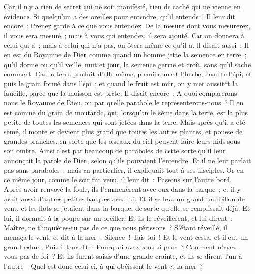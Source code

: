 \begin{multicols}{2}
Car il n'y a rien de secret qui ne soit manifesté, rien de caché qui ne vienne en évidence.
Si quelqu'un a des oreilles pour entendre, qu'il entende~!
Il leur dit encore~: Prenez garde à ce que vous entendez. De la mesure dont vous mesurerez, il vous sera mesuré~; mais à vous qui entendez, il sera ajouté.
Car on donnera à celui qui a~; mais à celui qui n'a pas, on ôtera même ce qu'il a.
Il disait aussi~: Il en est du Royaume de Dieu comme quand un homme jette la semence en terre~;
qu'il dorme ou qu'il veille, nuit et jour, la semence germe et croît, sans qu'il sache comment.
Car la terre produit d'elle-même, premièrement l'herbe, ensuite l'épi, et puis le grain formé dans l'épi~;
et quand le fruit est mûr, on y met aussitôt la faucille, parce que la moisson est prête.
Il disait encore~: A quoi comparerons-nous le Royaume de Dieu, ou par quelle parabole le représenterons-nous~?
Il en est comme du grain de moutarde, qui, lorsqu'on le sème dans la terre, est la plus petite de toutes les semences qui sont jetées dans la terre.
Mais après qu'il a été semé, il monte et devient plus grand que toutes les autres plantes, et pousse de grandes branches, en sorte que les oiseaux du ciel peuvent faire leurs nids sous son ombre.
Ainsi c'est par beaucoup de paraboles de cette sorte qu'il leur annonçait la parole de Dieu, selon qu'ils pouvaient l'entendre.
Et il ne leur parlait pas sans paraboles~; mais en particulier, il expliquait tout à ses disciples.
Or en ce même jour, comme le soir fut venu, il leur dit~: Passons sur l'autre bord.
Après avoir renvoyé la foule, ils l'emmenèrent avec eux dans la barque~; et il y avait aussi d'autres petites barques avec lui.
Et il se leva un grand tourbillon de vent, et les flots se jetaient dans la barque, de sorte qu'elle se remplissait déjà.
Et lui, il dormait à la poupe sur un oreiller. Et ils le réveillèrent, et lui dirent~: Maître, ne t'inquiètes-tu pas de ce que nous périssons~?
S'étant réveillé, il menaça le vent, et dit à la mer~: Silence~! Tais-toi~! Et le vent cessa, et il eut un grand calme.
Puis il leur dit~: Pourquoi avez-vous si peur~? Comment n'avez-vous pas de foi~?
Et ils furent saisis d'une grande crainte, et ils se dirent l'un à l'autre~: Quel est donc celui-ci, à qui obéissent le vent et la mer~?

\end{multicols}
